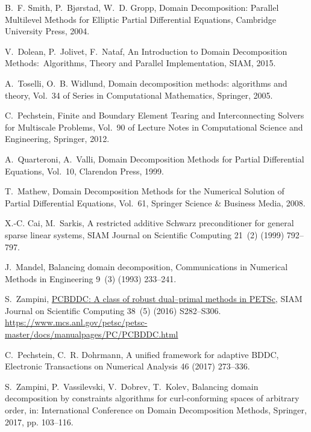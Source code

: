 \documentclass[3p,11pt]{elsarticle}
\newcommand\col{:}
\begin{document}
\begin{thebibliography}{10}
B.~F. Smith, P.~Bj{\o}rstad, W.~D. Gropp, Domain Decomposition: Parallel
  Multilevel Methods for Elliptic Partial Differential Equations, Cambridge
  University Press, 2004.

V.~Dolean, P.~Jolivet, F.~Nataf, An Introduction to Domain Decomposition
  Methods\col\ Algorithms, Theory and Parallel Implementation, SIAM, 2015.

A.~Toselli, O.~B. Widlund, Domain decomposition methods: algorithms and theory,
  Vol.~34 of Series in Computational Mathematics, Springer, 2005.

C.~Pechstein, Finite and Boundary Element Tearing and Interconnecting Solvers
  for Multiscale Problems, Vol.~90 of Lecture Notes in Computational Science
  and Engineering, Springer, 2012.

A.~Quarteroni, A.~Valli, Domain Decomposition Methods for Partial Differential
  Equations, Vol.~10, Clarendon Press, 1999.

T.~Mathew, Domain Decomposition Methods for the Numerical Solution of Partial
  Differential Equations, Vol.~61, Springer Science \& Business Media, 2008.

X.-C. Cai, M.~Sarkis, A restricted additive {S}chwarz preconditioner for
  general sparse linear systems, SIAM Journal on Scientific Computing 21~(2)
  (1999) 792--797.

J.~Mandel, Balancing domain decomposition, Communications in Numerical Methods
  in Engineering 9~(3) (1993) 233--241.

S.~Zampini,
  \href{https://www.mcs.anl.gov/petsc/petsc-master/docs/manualpages/PC/PCBDDC.html}{{PCBDDC}:
  A class of robust dual--primal methods in {PETS}c}, SIAM Journal on
  Scientific Computing 38~(5) (2016) S282--S306.
\newline\urlprefix\url{https://www.mcs.anl.gov/petsc/petsc-master/docs/manualpages/PC/PCBDDC.html}

C.~Pechstein, C.~R. Dohrmann, A unified framework for adaptive {BDDC},
  Electronic Transactions on Numerical Analysis 46 (2017) 273--336.

S.~Zampini, P.~Vassilevski, V.~Dobrev, T.~Kolev, Balancing domain decomposition
  by constraints algorithms for curl-conforming spaces of arbitrary order, in:
  International Conference on Domain Decomposition Methods, Springer, 2017, pp.
  103--116.


\end{thebibliography}
\end{document}
